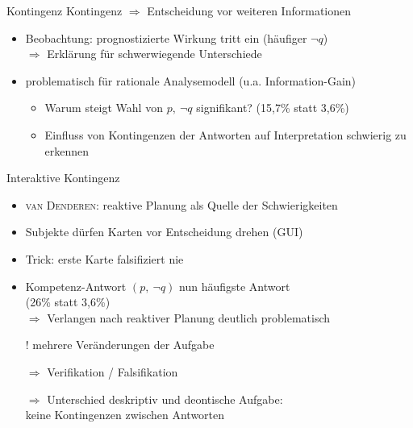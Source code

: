 \begin{frame}{Kontingenz {\scriptsize \cite[S.~105,109]{stenningHumanReasoningCognitive2008}}}
    Kontingenz $\Rightarrow$ Entscheidung vor weiteren Informationen
    \begin{itemize}
        \item Beobachtung: prognostizierte Wirkung tritt ein {\small (häufiger $\lnot q$)} \\
            $\Rightarrow$ Erklärung für schwerwiegende Unterschiede
        
        \item problematisch für rationale Analysemodell {\small (u.a. Information-Gain)}
        \begin{itemize}
            \item Warum steigt Wahl von $p,~\lnot q$ signifikant? (15,7\% statt 3,6\%)
            \item Einfluss von Kontingenzen der Antworten auf Interpretation schwierig zu erkennen
        \end{itemize}
    \end{itemize}
\end{frame}


\begin{frame}{Interaktive Kontingenz {\scriptsize \cite[S.~105,109]{stenningHumanReasoningCognitive2008}}}
    \begin{itemize}
        \item \textsc{van Denderen}: reaktive Planung als Quelle der Schwierigkeiten
        \item Subjekte dürfen Karten vor Entscheidung drehen (GUI)
        \item Trick: erste Karte falsifiziert nie
        \item Kompetenz-Antwort $(p,~\lnot q)$ nun häufigste Antwort \\
        (26\% statt 3,6\%) \\
        $\Rightarrow$ Verlangen nach reaktiver Planung deutlich problematisch
        
        \item[!] mehrere Veränderungen der Aufgabe
        \item[$\Rightarrow$] Verifikation / Falsifikation
        \item[$\Rightarrow$] Unterschied deskriptiv und deontische Aufgabe:\\
            keine Kontingenzen zwischen Antworten
    \end{itemize}
\end{frame}


